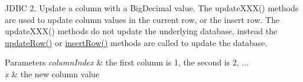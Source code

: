 J\+D\+BC 2. Update a column with a Big\+Decimal value. The update\+X\+X\+X() methods are used to update column values in the current row, or the insert row. The update\+X\+X\+X() methods do not update the underlying database, instead the \mbox{\hyperlink{classcom_1_1mysql_1_1jdbc_1_1_updatable_result_set_a919969ba4b3c7cbc7b18605e9f31a746}{update\+Row()}} or \mbox{\hyperlink{classcom_1_1mysql_1_1jdbc_1_1_updatable_result_set_aef041f8d9d0778083716fc26652648fa}{insert\+Row()}} methods are called to update the database.


\begin{DoxyParams}{Parameters}
{\em column\+Index} & the first column is 1, the second is 2, ... \\
\hline
{\em x} & the new column value\\
\hline
\end{DoxyParams}

